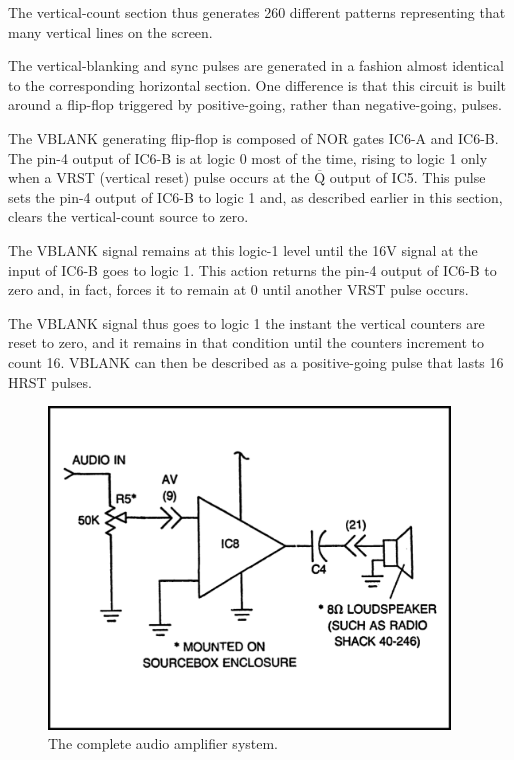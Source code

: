 \documentclass[11pt]{book}              %
\newcommand{\NOT}[1]{$\overline{\mbox{#1}}$}
\begin{document}
The vertical-count section thus generates 260 different patterns representing that many vertical lines on the screen.

The vertical-blanking and sync pulses are generated in a fashion almost identical to the corresponding horizontal section. One difference is that this circuit is built around a flip-flop triggered by positive-going, rather than negative-going, pulses.

The VBLANK generating flip-flop is composed of NOR gates IC6-A and IC6-B. The pin-4 output of IC6-B is at logic 0 most of the time, rising to logic 1 only when a VRST (vertical reset) pulse occurs at the \NOT{Q} output of IC5. This pulse sets the pin-4 output of IC6-B to logic 1 and, as described earlier in this section, clears the vertical-count source to zero.

The VBLANK signal remains at this logic-1 level until the 16V signal at the input of IC6-B goes to logic 1. This action returns the pin-4 output of IC6-B to zero and, in fact, forces it to remain at 0 until another VRST pulse occurs.

The VBLANK signal thus goes to logic 1 the instant the vertical counters are reset to zero, and it remains in that condition until the counters increment to count 16. VBLANK can then be described as a positive-going pulse that lasts 16 HRST pulses.

\begin{figure}
    \centering
    \includegraphics[width=0.95\textwidth]{images/fig2-6}
    \caption{The complete audio amplifier system.}
\end{figure}
\end{document}
